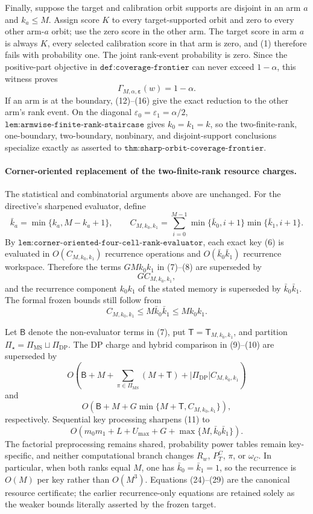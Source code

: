 Finally, suppose the target and calibration orbit supports are disjoint in an arm \(a\) and \(k_a\le M\). Assign score \(K\) to every target-supported orbit and zero to every other arm-\(a\) orbit; use the zero score in the other arm. The target score in arm \(a\) is always \(K\), every selected calibration score in that arm is zero, and (1) therefore fails with probability one. The joint rank-event probability is zero. Since the positive-part objective in \(\texttt{def:coverage-frontier}\) can never exceed \(1-\alpha\), this witness proves
\[
\Gamma_{M,\alpha,\boldsymbol\varepsilon}(w)=1-\alpha. \tag{23}
\]
If an arm is at the boundary, (12)--(16) give the exact reduction to the other arm's rank event. On the diagonal \(\varepsilon_0=\varepsilon_1=\alpha/2\), \(\texttt{lem:armwise-finite-rank-staircase}\) gives \(k_0=k_1=k\), so the two-finite-rank, one-boundary, two-boundary, nonbinary, and disjoint-support conclusions specialize exactly as asserted to \(\texttt{thm:sharp-orbit-coverage-frontier}\).
\paragraph{Corner-oriented replacement of the two-finite-rank resource charges.}
The statistical and combinatorial arguments above are unchanged. For the directive's sharpened evaluator, define
\[
\bar k_a=\min\{k_a,M-k_a+1\},\qquad
C_{M,k_0,k_1}=
\sum_{i=0}^{M-1}
\min\{\bar k_0,i+1\}\min\{\bar k_1,i+1\}. \tag{24}
\]
By \(\texttt{lem:corner-oriented-four-cell-rank-evaluator}\), each exact key (6) is evaluated in \(O(C_{M,k_0,k_1})\) recurrence operations and \(O(\bar k_0\bar k_1)\) recurrence workspace. Therefore the terms \(GMk_0k_1\) in (7)--(8) are superseded by
\[
G C_{M,k_0,k_1}, \tag{25}
\]
and the recurrence component \(k_0k_1\) of the stated memory is superseded by \(\bar k_0\bar k_1\). The formal frozen bounds still follow from
\[
C_{M,k_0,k_1}\le M\bar k_0\bar k_1\le Mk_0k_1. \tag{26}
\]

Let \(\mathsf B\) denote the non-evaluator terms in (7), put
\(\mathsf T=\mathsf T_{M,k_0,k_1}\), and partition
\(\Pi_\star=\Pi_{\mathrm{MS}}\sqcup\Pi_{\mathrm{DP}}\).
The DP charge and hybrid comparison in (9)--(10) are superseded by
\[
O\!\left(
\mathsf B+M+
\sum_{\pi\in\Pi_{\mathrm{MS}}}(M+\mathsf T)
+|\Pi_{\mathrm{DP}}|C_{M,k_0,k_1}
\right) \tag{27}
\]
and
\[
O\!\left(
\mathsf B+M+
G\min\{M+\mathsf T,C_{M,k_0,k_1}\}
\right), \tag{28}
\]
respectively. Sequential key processing sharpens (11) to
\[
O\!\left(
m_0m_1+L+U_{\max}+G+
\max\{M,\bar k_0\bar k_1\}
\right). \tag{29}
\]
The factorial preprocessing remains shared, probability power tables remain key-specific, and neither computational branch changes \(R_w\), \(P_T^C\), \(\pi\), or \(\omega_C\). In particular, when both ranks equal \(M\), one has \(\bar k_0=\bar k_1=1\), so the recurrence is \(O(M)\) per key rather than \(O(M^3)\). Equations (24)--(29) are the canonical resource certificate; the earlier recurrence-only equations are retained solely as the weaker bounds literally asserted by the frozen target.
